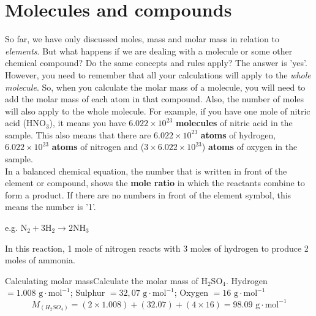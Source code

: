 



\section{Molecules and compounds}
\label{sec:quant:molecules}

So far, we have only discussed moles, mass and molar mass in relation to \textit{elements}. But what happens if we are dealing with a molecule or some other chemical compound? Do the same concepts and rules apply? The answer is 'yes'. However, you need to remember that all your calculations will apply to the \textit{whole molecule}. So, when you calculate the molar mass of a molecule, you will need to add the molar mass of each atom in that compound. Also, the number of moles will also apply to the whole molecule. For example, if you have one mole of nitric acid (HNO$_{3}$), it means you have $6.022 \times 10^{23}$ \textbf{molecules} of nitric acid in the sample. This also means that there are $6.022 \times 10^{23}$ \textbf{atoms} of hydrogen, $6.022 \times 10^{23}$ \textbf{atoms} of nitrogen and ($3 \times 6.022 \times 10^{23}$) \textbf{atoms} of oxygen in the sample. \\

In a balanced chemical equation, the number that is written in front of the element or compound, shows the \textbf{mole ratio} in which the reactants combine to form a product. If there are no numbers in front of the element symbol, this means the number is '1'.

\begin{center}
e.g.\@{} $\text{N}_{2} + 3\text{H}_{2} \rightarrow 2\text{NH}_{3}$
\end{center}

In this reaction, 1 mole of nitrogen reacts with 3 moles of hydrogen to produce 2 moles of ammonia.

\begin{wex}{Calculating molar mass}{Calculate the molar mass of H$_{2}$SO$_{4}$.}{
Hydrogen $= 1.008 \text{ g} \cdot \text{mol}^{-1}$; Sulphur $= 32,07 \text{ g} \cdot \text{mol}^{-1}$; Oxygen $= 16 \text{ g} \cdot \text{mol}^{-1}$
\begin{equation*}
M_{(H_{2}SO_{4})} = (2 \times 1.008) + (32.07) + (4 \times 16) = 98.09 \text{ g} \cdot \text{mol}^{-1}
\end{equation*}
}
\end{wex}

